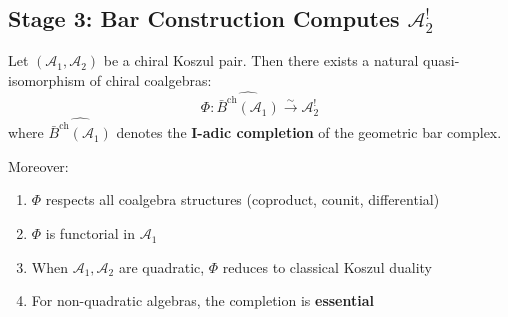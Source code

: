 
\subsection{Stage 3: Bar Construction Computes $\mathcal{A}_2^!$}

\begin{theorem}
\label{thm:bar-computes-koszul-dual-complete}

Let $(\mathcal{A}_1, \mathcal{A}_2)$ be a chiral Koszul pair. Then there exists a natural quasi-isomorphism of chiral coalgebras:
$$\Phi: \widehat{\bar{B}^{\text{ch}}(\mathcal{A}_1)} \xrightarrow{\sim} \mathcal{A}_2^!$$
where $\widehat{\bar{B}^{\text{ch}}(\mathcal{A}_1)}$ denotes the \textbf{I-adic completion} of the geometric bar complex.

Moreover:
\begin{enumerate}
\item $\Phi$ respects all coalgebra structures (coproduct, counit, differential)
\item $\Phi$ is functorial in $\mathcal{A}_1$
\item When $\mathcal{A}_1, \mathcal{A}_2$ are quadratic, $\Phi$ reduces to classical Koszul duality
\item For non-quadratic algebras, the completion is \textbf{essential}
\end{enumerate}
\end{theorem}

